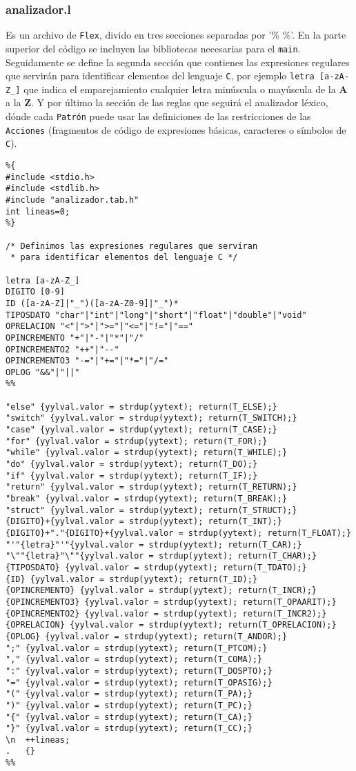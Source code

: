 \documentclass[spanish]{article}
\begin{document}
\subsubsection{analizador.l}
Es un archivo de \texttt{Flex}, divido en tres secciones separadas por '\% \%'. En la parte superior del código se incluyen las bibliotecas necesarias para el \texttt{main}. Seguidamente se define la segunda sección que contienes las expresiones regulares que servirán para identificar elementos del lenguaje \texttt{C}, por ejemplo \texttt{letra [a-zA-Z\_]} que indica el emparejamiento cualquier letra minúscula o mayúscula de la \textbf{A} a la \textbf{Z}. Y por último la sección de las reglas que seguirá el analizador léxico, dónde cada \texttt{Patrón} puede usar las definiciones de las restricciones de las \texttt{Acciones} (fragmentos de código de expresiones básicas, caracteres o símbolos de \texttt{C}).
\begin{lstlisting}
%{
#include <stdio.h>
#include <stdlib.h>
#include "analizador.tab.h"
int lineas=0;
%}

/* Definimos las expresiones regulares que serviran 
 * para identificar elementos del lenguaje C */	

letra [a-zA-Z_]
DIGITO [0-9]
ID ([a-zA-Z]|"_")([a-zA-Z0-9]|"_")*
TIPOSDATO "char"|"int"|"long"|"short"|"float"|"double"|"void" 
OPRELACION "<"|">"|">="|"<="|"!="|"=="
OPINCREMENTO "+"|"-"|"*"|"/"
OPINCREMENTO2 "++"|"--"
OPINCREMENTO3 "-="|"+="|"*="|"/="
OPLOG "&&"|"||"
%%

"else" {yylval.valor = strdup(yytext); return(T_ELSE);}
"switch" {yylval.valor = strdup(yytext); return(T_SWITCH);}
"case" {yylval.valor = strdup(yytext); return(T_CASE);}
"for" {yylval.valor = strdup(yytext); return(T_FOR);}
"while" {yylval.valor = strdup(yytext); return(T_WHILE);}
"do" {yylval.valor = strdup(yytext); return(T_DO);}
"if" {yylval.valor = strdup(yytext); return(T_IF);}
"return" {yylval.valor = strdup(yytext); return(T_RETURN);}
"break" {yylval.valor = strdup(yytext); return(T_BREAK);}
"struct" {yylval.valor = strdup(yytext); return(T_STRUCT);}
{DIGITO}+{yylval.valor = strdup(yytext); return(T_INT);}
{DIGITO}+"."{DIGITO}+{yylval.valor = strdup(yytext); return(T_FLOAT);}
"'"{letra}"'"{yylval.valor = strdup(yytext); return(T_CAR);}
"\""{letra}"\""{yylval.valor = strdup(yytext); return(T_CHAR);}
{TIPOSDATO} {yylval.valor = strdup(yytext); return(T_TDATO);}
{ID} {yylval.valor = strdup(yytext); return(T_ID);}
{OPINCREMENTO} {yylval.valor = strdup(yytext); return(T_INCR);}
{OPINCREMENTO3} {yylval.valor = strdup(yytext); return(T_OPAARIT);}
{OPINCREMENTO2} {yylval.valor = strdup(yytext); return(T_INCR2);}
{OPRELACION} {yylval.valor = strdup(yytext); return(T_OPRELACION);}
{OPLOG} {yylval.valor = strdup(yytext); return(T_ANDOR);}
";" {yylval.valor = strdup(yytext); return(T_PTCOM);}
"," {yylval.valor = strdup(yytext); return(T_COMA);}
":" {yylval.valor = strdup(yytext); return(T_DOSPTO);}
"=" {yylval.valor = strdup(yytext); return(T_OPASIG);}
"(" {yylval.valor = strdup(yytext); return(T_PA);}
")" {yylval.valor = strdup(yytext); return(T_PC);}
"{" {yylval.valor = strdup(yytext); return(T_CA);}
"}" {yylval.valor = strdup(yytext); return(T_CC);}
\n 	++lineas;
.   {}
%%
\end{lstlisting}
\end{document}
